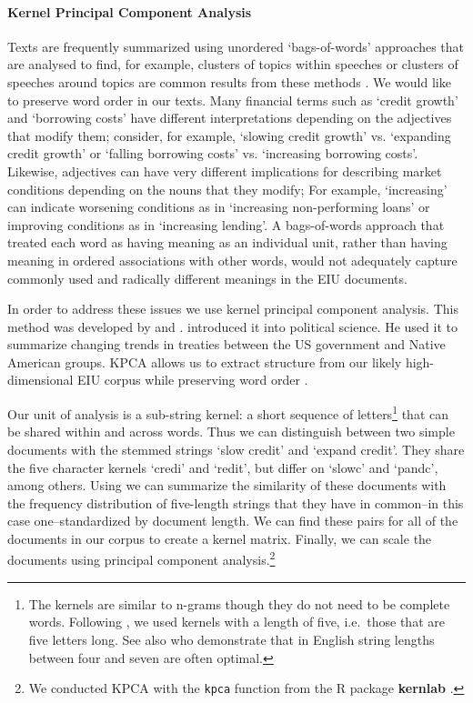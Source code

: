 \documentclass[]{article}
\begin{document}
\paragraph{Kernel Principal Component
Analysis}\label{kernel-principal-component-analysis}

Texts are frequently summarized using unordered `bags-of-words'
approaches that are analysed to find, for example, clusters of topics within speeches or clusters of speeches around topics are common results from these methods \citep[for a review see][]{Grimmer2013}. We would like to preserve word order in our texts. Many financial terms such as `credit growth' and `borrowing costs' have different interpretations depending on the adjectives that modify them; consider, for example, `slowing credit growth' vs. `expanding credit growth' or `falling borrowing costs' vs. `increasing borrowing costs'. Likewise, adjectives can have very different implications for describing market conditions depending on the nouns that they modify;  For example, `increasing' can indicate worsening conditions as in `increasing non-performing loans' or improving conditions as in `increasing lending'.  A bags-of-words approach that treated each word as having meaning as an individual unit, rather than having meaning in ordered associations with other words, would not adequately capture commonly used and radically different meanings in the EIU documents.

In order to address these issues we use kernel principal component analysis. This method was developed by \cite{Scholkopf1998} and \cite{lodhi2002}. \cite{Spirling2012} introduced it into political science. He used it to summarize changing trends in treaties between the US government and Native American groups. KPCA allows us to extract structure from our likely high-dimensional EIU corpus while preserving word order \cite[6531--6537]{Zhang2010}.

Our unit of analysis is a sub-string kernel: a short sequence of letters\footnote{The kernels are similar to n-grams though they do not need to be complete words. Following \cite{Spirling2012}, we used kernels with a length of five, i.e.~those that are five letters long. See also \cite{lodhi2002} who demonstrate that in English string lengths between four and seven are often optimal.} that can be shared within and across words. Thus we can distinguish between two simple documents with the stemmed strings `slow credit' and `expand credit'. They share the five character kernels `credi' and `redit', but differ on `slowc' and `pandc', among others. Using \cite{lodhi2002} we can summarize the similarity of these documents with the frequency distribution of five-length strings that they have in common--in this case one--standardized by document length. We can find these pairs for all of the documents in our corpus to create a kernel matrix. Finally, we can scale the documents using principal component analysis.\footnote{We conducted KPCA with the \texttt{kpca} function from the R package \textbf{kernlab} \citep{kerblabCite}.}
\end{document}
